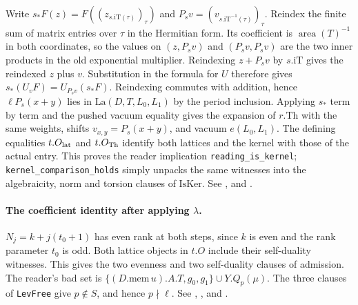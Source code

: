 Write $s_*F(z)=F((z_{s.\mathrm{iT}(\tau)})_\tau)$ and
$P_s v=(v_{s.\mathrm{iT}^{-1}(\tau)})_\tau$.
Reindex the finite sum of matrix entries over $\tau$ in the Hermitian
form. Its coefficient is $\operatorname{area}(T)^{-1}$ in both coordinates,
so the values on $(z,P_sv)$ and $(P_sv,P_sv)$ are the two inner products
in the old exponential multiplier. Reindexing $z+P_sv$ by $s.\mathrm{iT}$ gives the reindexed $z$ plus $v$. Substitution in the formula
for $U$ therefore gives $s_*(U_vF)=U_{P_sv}(s_*F)$. Reindexing commutes
with addition, hence $\ell P_s(x+y)$ lies in $\mathrm{La}(D,T,L_0,L_1)$
by the period inclusion. Applying $s_*$ term by term and the pushed
vacuum equality gives the expansion of $r.\mathrm{Th}$ with the
same weights, shifts $v_{x,y}=P_s(x+y)$, and vacuum $e(L_0,L_1)$.
The defining equalities $t.O_{\rm lat}$ and $t.O_{\rm Th}$ identify
both lattices and the kernel with those of the actual entry.
This proves the reader implication \nolinkurl{reading_is_kernel};
\nolinkurl{kernel_comparison_holds} simply unpacks the same witnesses
into the algebraicity, norm and torsion clauses of $\mathrm{IsKer}$.
See ,
 and
.

\paragraph{The coefficient identity after applying $\lambda$.}
\label{r14:comb-pseries}
$N_j=k+j(t_0+1)$ has even rank at both steps, since $k$ is even and the
rank parameter $t_0$ is odd. Both lattice objects in $t.O$ include their
self-duality witnesses. This gives the two evenness and two self-duality
clauses of admission. The reader's bad set is
$\{(D.\mathrm{mem}\,u).A.T,g_0,g_1\}\cup Y.Q_p(\mu)$.
The three clauses of \nolinkurl{LevFree} give $p\notin S$, and hence
$p\nmid\ell$. See ,
, 
and .

